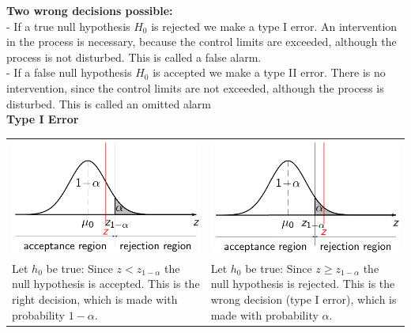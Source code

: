 \textbf{Two wrong decisions possible:}\\
 - If a true null hypothesis $H_0$ is rejected we make a type I error. An intervention in the process is necessary, because the control limits are exceeded, although the process is not disturbed. This is called a false alarm.\\
 - If a false null hypothesis $H_0$ is accepted we make a type II error. There is no intervention, since the control limits are not exceeded, although the process is disturbed. This is called an omitted alarm\\

\textbf{Type I Error}\\
\begin{table}[H]
  \setlength{\tabcolsep}{0.2em}
  \scriptsize
  \begin{tabular}{p{}@{\hskip 1em}p{}}
    \includegraphics[width=\linewidth]{Pics/3.2.1.png}& \includegraphics[width=\linewidth]{Pics/3.2.2.png} \\
    Let $h_0$ be true: Since $z < z_{1-\alpha}$ the null hypothesis is accepted. This is the right decision, which is made with probability $1-\alpha$. &
    Let $h_0$ be true: Since $z \geq z_{1-\alpha}$ the null hypothesis is rejected. This is the wrong decision (type I error), which is made with probability $\alpha$.
  \end{tabular}
\end{table}

